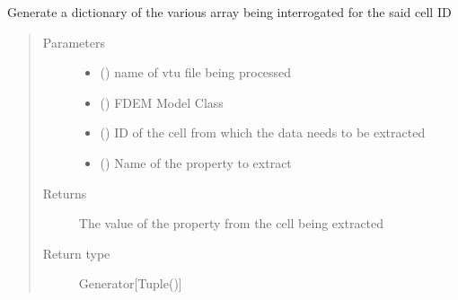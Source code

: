 \documentclass[letterpaper,10pt,english]{sphinxmanual}
\begin{document}
\begin{fulllineitems}
\label{\detokenize{openfdem:openfdem.extract_cell_thread_pool_generators.history_cellinfo_func}}
Generate a dictionary of the various array being interrogated for the said cell ID
\begin{quote}\begin{description}
\item[{Parameters}] \leavevmode\begin{itemize}
\item {} 
 () \textendash{} name of vtu file being processed

\item {} 
 ({\hyperref[\detokenize{openfdem:openfdem.openfdem.Model}]{}}) \textendash{} FDEM Model Class

\item {} 
 () \textendash{} ID of the cell from which the data needs to be extracted

\item {} 
 (\sphinxstyleliteralemphasis{\sphinxupquote{{[}}}\sphinxstyleliteralemphasis{\sphinxupquote{{]}}}) \textendash{} Name of the property to extract

\end{itemize}

\item[{Returns}] \leavevmode
The value of the property from the cell being extracted

\item[{Return type}] \leavevmode
Generator{[}Tuple(){]}

\end{description}\end{quote}

\end{fulllineitems}
\end{document}
